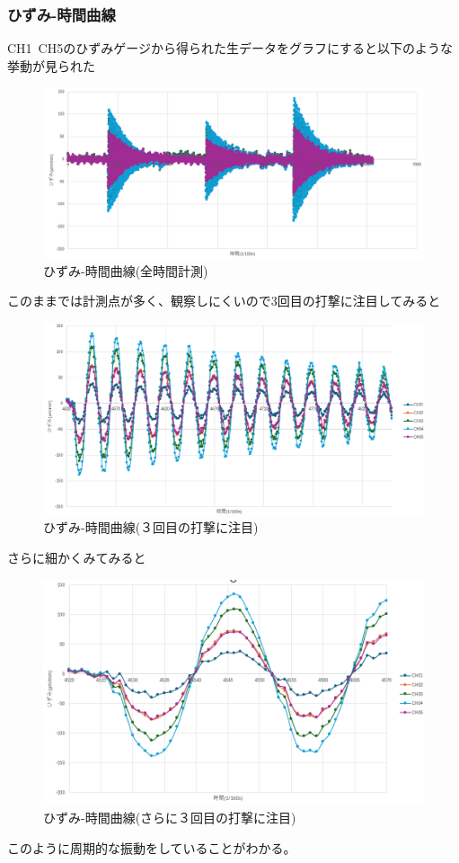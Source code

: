 \documentclass[a4j]{jarticle}
\begin{document}
\subsubsection{ひずみ-時間曲線}
CH1~CH5のひずみゲージから得られた生データをグラフにすると以下のような挙動が見られた
\begin{figure}[H]
    \centering
    \includegraphics[width=0.8\linewidth]{summer/ship-experiment/bend/picture/hizumi-time-all.png}
    \caption{ひずみ-時間曲線(全時間計測)}
    \label{fig:hizumi-time-all}
\end{figure}

このままでは計測点が多く、観察しにくいので3回目の打撃に注目してみると
\begin{figure}[H]
    \centering
    \includegraphics[width=0.8\linewidth]{summer/ship-experiment/bend/picture/hizumi-time-3.png}
    \caption{ひずみ-時間曲線(３回目の打撃に注目)}
    \label{fig:hizumi-time-3}
\end{figure}
さらに細かくみてみると
\begin{figure}[H]
    \centering
    \includegraphics[width=0.5\linewidth]{summer/ship-experiment/bend/picture/hizumi-time-detail.png}
    \caption{ひずみ-時間曲線(さらに３回目の打撃に注目)}
    \label{fig:hizumi-time-detail}
\end{figure}
このように周期的な振動をしていることがわかる。
\end{document}

